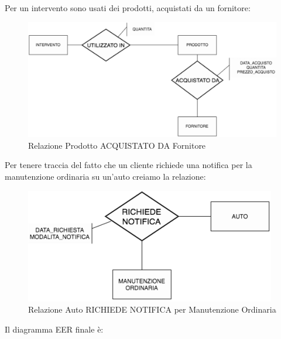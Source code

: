Per un intervento sono usati dei prodotti, acquistati da un fornitore:

\begin{center}
\begin{figure}[H]
\centering
\includegraphics[scale=1]{figures/prodotto_acquistatoda_fornitore.png}
\caption{Relazione Prodotto ACQUISTATO DA Fornitore}
\end{figure}
\end{center}

Per tenere traccia del fatto che un cliente richiede una notifica per la manutenzione ordinaria su un’auto creiamo la relazione:

\begin{center}
\begin{figure}[H]
\centering
\includegraphics[scale=1]{figures/auto_richiedenotificax_manutenzioneordinaria.png}
\caption{Relazione Auto RICHIEDE NOTIFICA per Manutenzione Ordinaria}
\end{figure}
\end{center}

\newpage

Il diagramma EER finale è:
 
